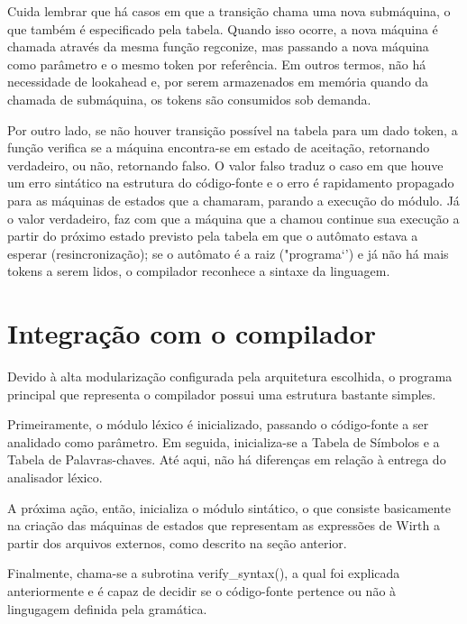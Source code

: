 \documentclass[12pt,oneside,a4paper,english]{abntex2}
\begin{document}
  Cuida lembrar que há casos em que a transição chama uma nova submáquina, o que também é especificado pela tabela. Quando isso ocorre, a nova máquina é chamada através da mesma função regconize, mas passando a nova máquina como parâmetro e o mesmo token por referência. Em outros termos, não há necessidade de lookahead e, por serem armazenados em memória quando da chamada de submáquina, os tokens são consumidos sob demanda.


  Por outro lado, se não houver transição possível na tabela para um dado token, a função verifica se a máquina encontra-se em estado de aceitação, retornando verdadeiro, ou não, retornando falso. O valor falso traduz o caso em que houve um erro sintático na estrutura do código-fonte e o erro é rapidamento propagado para as máquinas de estados que a chamaram, parando a execução do módulo. Já o valor verdadeiro, faz com que a máquina que a chamou continue sua execução a partir do próximo estado previsto pela tabela em que o autômato estava a esperar (resincronização); se o autômato é a raiz ("programa`') e já não há mais tokens a serem lidos, o compilador reconhece a sintaxe da linguagem.


  \section{Integração com o compilador}


  Devido à alta modularização configurada pela arquitetura escolhida, o programa principal que representa o compilador possui uma estrutura bastante simples. 


  Primeiramente, o módulo léxico é inicializado, passando o código-fonte a ser analidado como parâmetro. Em seguida, inicializa-se a Tabela de Símbolos e a Tabela de Palavras-chaves. Até aqui, não há diferenças em relação à entrega do analisador léxico.


  A próxima ação, então, inicializa o módulo sintático, o que consiste basicamente na criação das máquinas de estados que representam as expressões de Wirth a partir dos arquivos externos, como descrito na seção anterior.

 
 Finalmente, chama-se a subrotina verify_syntax(), a qual foi explicada anteriormente e é capaz de decidir se o código-fonte pertence ou não à lingugagem definida pela gramática.
\end{document}
